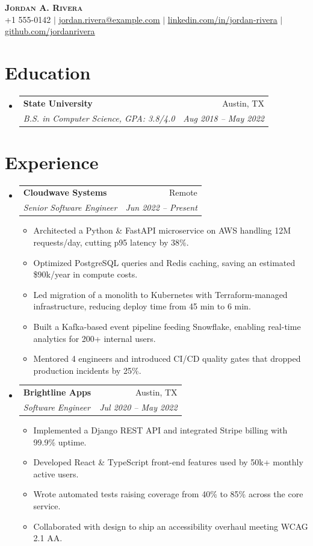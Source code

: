 \documentclass[letterpaper,11pt]{article}
\makeatletter
\newcommand{\resumeItem}[1]{
  \item\small{{#1 \vspace{-2pt}}}
}
\newcommand{\resumeSubheading}[4]{
  \vspace{-2pt}\item
    \begin{tabular*}{0.97\textwidth}[t]{l@{\extracolsep{\fill}}r}
      \textbf{#1} & #2 \\
      \textit{\small#3} & \textit{\small #4} \\
    \end{tabular*}\vspace{-7pt}
}
\newcommand{\resumeSubHeadingListStart}{\begin{itemize}[leftmargin=0.15in, label={}]}
\newcommand{\resumeSubHeadingListEnd}{\end{itemize}}
\newcommand{\resumeItemListStart}{\begin{itemize}}
\newcommand{\resumeItemListEnd}{\end{itemize}\vspace{-5pt}}
\makeatother
\begin{document}
\begin{center}
    \textbf{\Huge \scshape Jordan A. Rivera} \\ \vspace{1pt}
    \small +1 555-0142 $|$
    \href{mailto:jordan.rivera@example.com}{\underline{jordan.rivera@example.com}} $|$
    \href{https://linkedin.com/in/jordan-rivera}{\underline{linkedin.com/in/jordan-rivera}} $|$
    \href{https://github.com/jordanrivera}{\underline{github.com/jordanrivera}}
\end{center}

\section{Education}
  \resumeSubHeadingListStart
    \resumeSubheading
      {State University}{Austin, TX}
      {B.S. in Computer Science, GPA: 3.8/4.0}{Aug 2018 -- May 2022}
  \resumeSubHeadingListEnd

\section{Experience}
  \resumeSubHeadingListStart
    \resumeSubheading
      {Cloudwave Systems}{Remote}
      {Senior Software Engineer}{Jun 2022 -- Present}
      \resumeItemListStart
        \resumeItem{Architected a Python \& FastAPI microservice on AWS handling 12M requests/day, cutting p95 latency by 38\%.}
        \resumeItem{Optimized PostgreSQL queries and Redis caching, saving an estimated \$90k/year in compute costs.}
        \resumeItem{Led migration of a monolith to Kubernetes with Terraform-managed infrastructure, reducing deploy time from 45 min to 6 min.}
        \resumeItem{Built a Kafka-based event pipeline feeding Snowflake, enabling real-time analytics for 200+ internal users.}
        \resumeItem{Mentored 4 engineers and introduced CI/CD quality gates that dropped production incidents by 25\%.}
      \resumeItemListEnd
    \resumeSubheading
      {Brightline Apps}{Austin, TX}
      {Software Engineer}{Jul 2020 -- May 2022}
      \resumeItemListStart
        \resumeItem{Implemented a Django REST API and integrated Stripe billing with 99.9\% uptime.}
        \resumeItem{Developed React \& TypeScript front-end features used by 50k+ monthly active users.}
        \resumeItem{Wrote automated tests raising coverage from 40\% to 85\% across the core service.}
        \resumeItem{Collaborated with design to ship an accessibility overhaul meeting WCAG 2.1 AA.}
      \resumeItemListEnd
  \resumeSubHeadingListEnd
\end{document}
